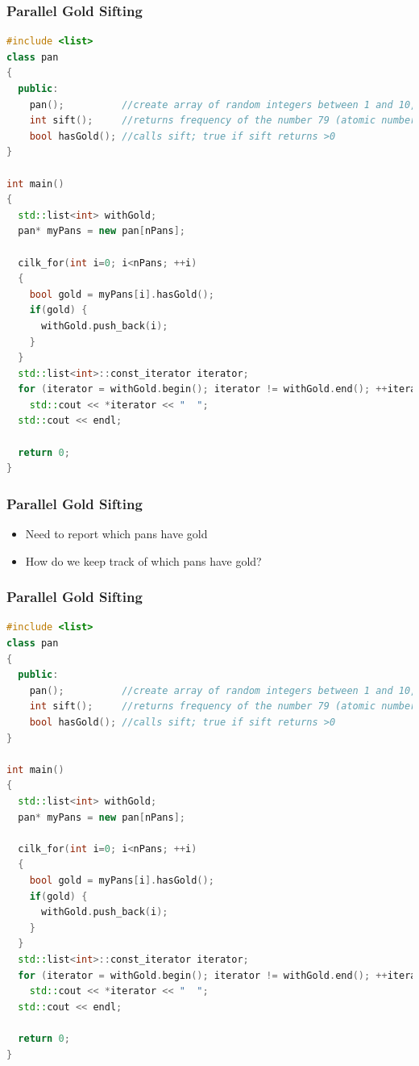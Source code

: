 \documentclass[fleqn,xcolor=table,10pt,final]{beamer}
\begin{document}
\begin{frame}[fragile]
  \frametitle{Parallel Gold Sifting}
  \begin{lstlisting}[language=C++,basicstyle=\scriptsize]
#include <list>
class pan
{
  public:
    pan();          //create array of random integers between 1 and 10,000
    int sift();     //returns frequency of the number 79 (atomic number of gold)
    bool hasGold(); //calls sift; true if sift returns >0
}

int main()
{
  std::list<int> withGold;
  pan* myPans = new pan[nPans];

  cilk_for(int i=0; i<nPans; ++i)
  {
    bool gold = myPans[i].hasGold();
    if(gold) {
      withGold.push_back(i);
    }
  }
  std::list<int>::const_iterator iterator;
  for (iterator = withGold.begin(); iterator != withGold.end(); ++iterator)
    std::cout << *iterator << "  ";
  std::cout << endl;

  return 0;
}
  \end{lstlisting}
\end{frame}

\begin{frame}
  \frametitle{Parallel Gold Sifting}
  \begin{itemize}
    \item Need to report which pans have gold
    \item How do we keep track of which pans have gold?
  \end{itemize}
\end{frame}

\begin{frame}[fragile]
  \frametitle{Parallel Gold Sifting}
  \begin{lstlisting}[language=C++,basicstyle=\scriptsize]
#include <list>
class pan
{
  public:
    pan();          //create array of random integers between 1 and 10,000
    int sift();     //returns frequency of the number 79 (atomic number of gold)
    bool hasGold(); //calls sift; true if sift returns >0
}

int main()
{
  std::list<int> withGold;
  pan* myPans = new pan[nPans];

  cilk_for(int i=0; i<nPans; ++i)
  {
    bool gold = myPans[i].hasGold();
    if(gold) {
      withGold.push_back(i);
    }
  }
  std::list<int>::const_iterator iterator;
  for (iterator = withGold.begin(); iterator != withGold.end(); ++iterator)
    std::cout << *iterator << "  ";
  std::cout << endl;

  return 0;
}
  \end{lstlisting}
\end{frame}
\end{document}
